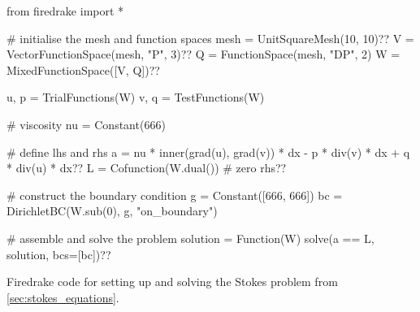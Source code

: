 \documentclass[thesis]{subfiles}
\begin{document}
\begin{listing}
  \centering
  \begin{minipage}{.9\textwidth}
    \begin{pyalg2}
      from firedrake import *

      # initialise the mesh and function spaces
      mesh = UnitSquareMesh(10, 10)?\label{code:stokes_init_mesh}?
      V = VectorFunctionSpace(mesh, "P", 3)?\label{code:stokes_spaces_begin}?
      Q = FunctionSpace(mesh, "DP", 2)
      W = MixedFunctionSpace([V, Q])?\label{code:stokes_spaces_end}?

      u, p = TrialFunctions(W)
      v, q = TestFunctions(W)

      # viscosity
      nu = Constant(666)

      # define lhs and rhs
      a = nu * inner(grad(u), grad(v)) * dx - p * div(v) * dx + q * div(u) * dx?\label{code:stokes_bilinear_form}?
      L = Cofunction(W.dual())  # zero rhs?\label{code:stokes_linear_form}?

      # construct the boundary condition
      g = Constant([666, 666])
      bc = DirichletBC(W.sub(0), g, "on_boundary")

      # assemble and solve the problem
      solution = Function(W)
      solve(a == L, solution, bcs=[bc])?\label{code:stokes_solve}?
    \end{pyalg2}
  \end{minipage}
  \caption{
    Firedrake code for setting up and solving the Stokes problem from \cref{sec:stokes_equations}.
  }
  \label{listing:stokes_demo}
\end{listing}
\end{document}

